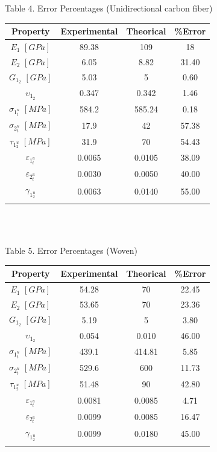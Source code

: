 \begin{table,array}%
\caption{Table 4. Error Percentages (Unidirectional carbon fiber) \cite{pcl} \cite{navarro}  }  %
\label{tab:4}       %
\begin{center}
\begin{tabular}{cccc}
\hline\noalign{\smallskip}
Property & Experimental & Theorical & {\%}Error  \\
\hline\noalign{\smallskip}\hline\noalign{\smallskip}
$E_1$ $[GPa]$& 89.38 & 109 & 18 \\
$E_2$ $[GPa]$& 6.05 & 8.82 & 31.40 \\
$G_1_2$ $[GPa]$& 5.03 & 5 & 0.60 \\
$\upsilon_1_2$& 0.347 & 0.342 & 1.46\\
$\sigma_1_t^u$ $[MPa]$& 584.2 & 585.24 & 0.18\\
$\sigma_2_t^u$ $[MPa]$& 17.9 & 42 & 57.38 \\
$\tau_1_2^u$ $[MPa]$& 31.9 & 70 & 54.43\\
$\varepsilon_1_t^u$& 0.0065 & 0.0105 & 38.09\\
$\varepsilon_2_t^u$& 0.0030 & 0.0050 & 40.00\\
$\gamma_1_2^u$& 0.0063 & 0.0140 & 55.00\\
\noalign{\smallskip}\hline
\end{tabular}
\end{center}
\end{table,array}\\
\\
\vspace{4cm}
\begin{table,array}%
\caption{Table 5. Error Percentages (Woven) \cite{pcl} \cite{navarro}}  %
\label{tab:5}       %
\begin{center}
\begin{tabular}{cccc}
\hline\noalign{\smallskip}
Property & Experimental & Theorical & {\%}Error  \\
\hline\noalign{\smallskip}\hline\noalign{\smallskip}
$E_1$ $[GPa]$& 54.28 & 70 & 22.45 \\
$E_2$ $[GPa]$& 53.65 & 70 & 23.36 \\
$G_1_2$ $[GPa]$& 5.19 & 5 & 3.80 \\
$\upsilon_1_2$& 0.054 & 0.010 & 46.00\\
$\sigma_1_t^u$ $[MPa]$& 439.1 & 414.81 & 5.85\\
$\sigma_2_t^u$ $[MPa]$& 529.6 & 600 & 11.73 \\
$\tau_1_2^u$ $[MPa]$& 51.48 & 90 & 42.80\\
$\varepsilon_1_t^u$& 0.0081 & 0.0085 & 4.71\\
$\varepsilon_2_t^u$& 0.0099 & 0.0085 & 16.47\\
$\gamma_1_2^u$& 0.0099 & 0.0180 & 45.00\\
\noalign{\smallskip}\hline
\end{tabular}
\end{center}
\end{table,array}\\
